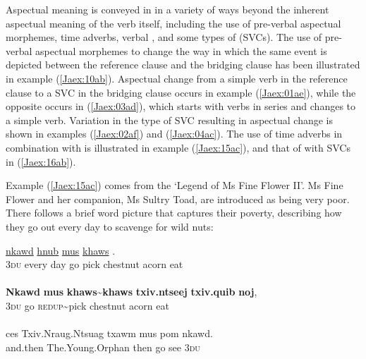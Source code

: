 \documentclass[output=paper]{LSP/langsci}
\begin{document}
Aspectual meaning is conveyed in  in a variety of ways beyond the inherent aspectual meaning of the verb itself, including the use of pre-verbal aspectual morphemes, time adverbs, verbal , and some types of  (SVCs). The use of pre-verbal aspectual morphemes to change the way in which the same event is depicted between the reference clause and the bridging clause has been illustrated in example (\ref{Jaex:10ab}). Aspectual change from a simple verb in the reference clause to a SVC in the bridging clause occurs in example (\ref{Jaex:01ae}), while the opposite occurs in (\ref{Jaex:03ad}), which starts with verbs in series and changes to a simple verb. Variation in the type of SVC resulting in aspectual change is shown in examples (\ref{Jaex:02af}) and (\ref{Jaex:04ac}). The use of time adverbs in combination with  is illustrated in example (\ref{Jaex:15ac}), and that of  with SVCs in (\ref{Jaex:16ab}). 

Example (\ref{Jaex:15ac}) comes from the `Legend of Ms Fine Flower II'. Ms Fine Flower and her companion, Ms Sultry Toad, are introduced as being very poor. There follows a brief word picture that captures their poverty, describing how they go out every day to scavenge for wild nuts:


\begin{exe}
\ex \label{Jaex:15ac}
\begin{xlist}
\ex \label{Jaex:15a}
\gll  \underline{nkawd} \underline{} \underline{hnub} \underline{mus} \underline{khaws} \underline{}     \underline{} \underline{}.\\
 3\textsc{du} every day go pick chestnut  acorn eat\\
\glt {}\\
\ex \label{Jaex:15b}
\gll \textbf{Nkawd} \textbf{mus}  \textbf{khaws{\textasciitilde}khaws} \textbf{txiv.ntseej} \textbf{txiv.quib } \textbf{noj}, \\     	      
     3\textsc{du}  go  \textsc{redup}{\textasciitilde}pick   chestnut  acorn  eat\\
\glt {} \\
\ex \label{Jaex:15c}
\gll ces Txiv.Nraug.Ntsuag txawm mus pom nkawd.\\     	      
     and.then The.Young.Orphan then go see 3\textsc{du}\\
\glt {} \citep[][161]{johnson92}
\end{xlist}
\end{exe}
\end{document}
